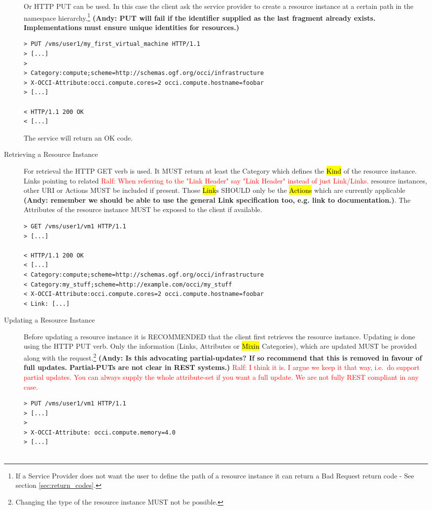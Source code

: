 \documentclass[10pt,a4paper]{article}
\newcommand{\ralf}[1]{\textcolor{red}{Ralf: #1}}
\begin{document}
\begin{description}
  Or HTTP PUT can be used. In this case the client ask the service
  provider to create a resource instance at a certain path in the
  namespace hierarchy.\footnote{If a Service Provider does not want the
    user to define the path of a resource instance it can return a Bad
    Request return code - See section \ref{sec:return_codes}.} \textbf{(Andy: PUT will fail if the 
    identifier supplied as the last fragment already exists. Implementations must ensure unique 
    identities for resources.)}
\begin{verbatim}
> PUT /vms/user1/my_first_virtual_machine HTTP/1.1
> [...]
> 
> Category:compute;scheme=http://schemas.ogf.org/occi/infrastructure
> X-OCCI-Attribute:occi.compute.cores=2 occi.compute.hostname=foobar
> [...]
 
< HTTP/1.1 200 OK
< [...]
\end{verbatim}
  The service will return an OK code.

\item[Retrieving a Resource Instance] For retrieval the HTTP GET verb
  is used. It MUST return at least the Category which defines the
  \hl{Kind} of the resource instance. Links pointing to related
  \ralf{When referring to the "Link Header" say "Link Header" instead of just
  Link/Links.}
  resource instances, other URI or Actions MUST be included if
  present. Those \hl{Link}s SHOULD only be the
  \hl{Actions} which are currently applicable \textbf{(Andy: remember we should be able to use the 
  general Link specification too, e.g. link to documentation.)}. The Attributes of the 
  resource instance MUST be exposed to
  the client if available.
\begin{verbatim}
> GET /vms/user1/vm1 HTTP/1.1
> [...]
 
< HTTP/1.1 200 OK
< [...]
< Category:compute;scheme=http://schemas.ogf.org/occi/infrastructure
< Category:my_stuff;scheme=http://example.com/occi/my_stuff
< X-OCCI-Attribute:occi.compute.cores=2 occi.compute.hostname=foobar
< Link: [...]
\end{verbatim}

\item[Updating a Resource Instance] Before updating a resource
  instance it is RECOMMENDED that the client first retrieves the
  resource instance. Updating is done using the HTTP PUT verb. Only
  the information (Links, Attributes or \hl{Mixin} Categories), which
  are updated MUST be provided along with the
  request.\footnote{Changing the type of the resource instance MUST
    not be possible.} \textbf{(Andy: Is this advocating partial-updates? If so recommend 
    that this is removed in favour of full updates. Partial-PUTs are not clear in REST systems.)}
  \ralf{I think it is. I argue we keep it that way, i.e.~do support partial
  updates. You can always supply the whole attribute-set if you want a full
  update. We are not fully REST compliant in any case.}
\begin{verbatim}
> PUT /vms/user1/vm1 HTTP/1.1
> [...]
> 
> X-OCCI-Attribute: occi.compute.memory=4.0
> [...]
 

\end{verbatim}
\end{description}
\end{document}
